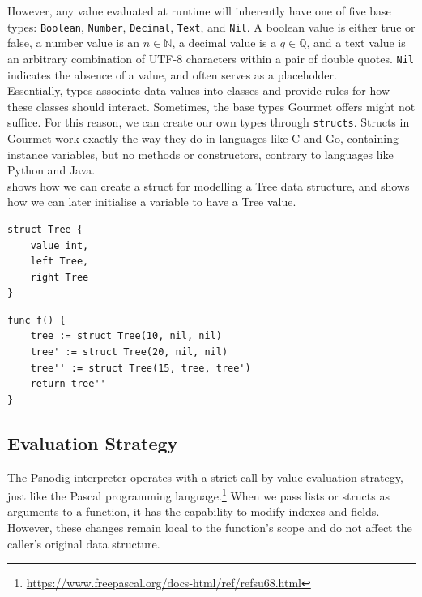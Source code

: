 However, any value evaluated at runtime will inherently have one of five base types:  \texttt{Boolean}, \texttt{Number}, \texttt{Decimal}, \texttt{Text}, and \texttt{Nil}. A boolean value is either true or false, a number value is an  $n \in \mathbb{N}$, a decimal value is a $q \in \mathbb{Q}$, and a text value is an arbitrary combination of UTF-8 characters within a pair of double quotes. \texttt{Nil} indicates the absence of a value, and often serves as a placeholder. \\

Essentially, types associate data values into classes and provide rules for how these classes should interact. Sometimes, the base types Gourmet offers might not suffice. For this reason, we can create our own types through \texttt{structs}. Structs in Gourmet work exactly the way they do in languages like C and Go, containing instance variables, but no methods or constructors, contrary to languages like Python and Java. \\

 shows how we can create a struct for modelling a Tree data structure, and  shows how we can later initialise a variable to have a Tree value. \\

\begin{lstlisting}[caption={A Gourmet struct Tree, with instance variables \texttt{value}, \texttt{left} and \texttt{right}.}, captionpos=b, label={Gourmet Tree}]
struct Tree {
    value int,
    left Tree,
    right Tree
}
\end{lstlisting}

\begin{lstlisting}[caption={A function to initialise three Tree structs and return the last one.},captionpos=b, label={A function to initialise three tree structs and return the last one.}]
func f() {
    tree := struct Tree(10, nil, nil)
    tree' := struct Tree(20, nil, nil)
    tree'' := struct Tree(15, tree, tree')
    return tree''
}
\end{lstlisting}

\subsection{Evaluation Strategy}

The Psnodig interpreter operates with a strict call-by-value evaluation strategy, just like the Pascal programming language.\footnote{\url{https://www.freepascal.org/docs-html/ref/refsu68.html}} When we pass lists or structs as arguments to a function, it has the capability to modify indexes and fields. However, these changes remain local to the function's scope and do not affect the caller's original data structure.

